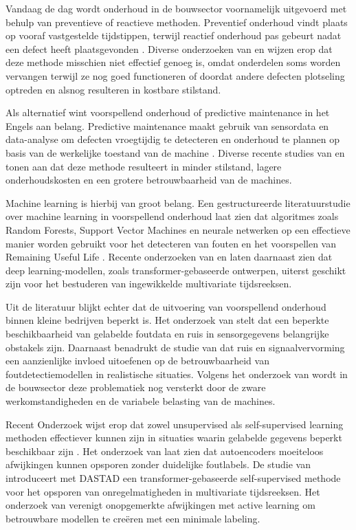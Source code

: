 Vandaag de dag wordt onderhoud in de bouwsector voornamelijk uitgevoerd met behulp van preventieve of reactieve methoden. Preventief onderhoud vindt plaats op vooraf vastgestelde tijdstippen, terwijl reactief onderhoud pas gebeurt nadat een defect heeft plaatsgevonden \autocite{Mikulic2024, Morganti2024}. Diverse onderzoeken van \textcite{Deepak2025} en \textcite{ErRatby2025} wijzen erop dat deze methode misschien niet effectief genoeg is, omdat onderdelen soms worden vervangen terwijl ze nog goed functioneren of doordat andere defecten plotseling optreden en alsnog resulteren in kostbare stilstand.

Als alternatief wint voorspellend onderhoud of predictive maintenance in het Engels aan belang. Predictive maintenance maakt gebruik van sensordata en data-analyse om defecten vroegtijdig te detecteren en onderhoud te plannen op basis van de werkelijke toestand van de machine \autocite{Carvalho2019}. Diverse recente studies van \textcite{ErRatby2025} en \textcite{Mahale2025} tonen aan dat deze methode resulteert in minder stilstand, lagere onderhoudskosten en een grotere betrouwbaarheid van de machines.

Machine learning is hierbij van groot belang. Een gestructureerde literatuurstudie over machine learning in voorspellend onderhoud laat zien dat algoritmes zoals Random Forests, Support Vector Machines en neurale netwerken op een effectieve manier worden gebruikt voor het detecteren van fouten en het voorspellen van Remaining Useful Life \autocite{Carvalho2019}. Recente onderzoeken van \textcite{Li2025} en \textcite{Aggarwal2025} laten daarnaast zien dat deep learning-modellen, zoals transformer-gebaseerde ontwerpen, uiterst geschikt zijn voor het bestuderen van ingewikkelde multivariate tijdsreeksen.

Uit de literatuur blijkt echter dat de uitvoering van voorspellend onderhoud binnen kleine bedrijven beperkt is. Het onderzoek van \textcite{Elahi2023} stelt dat een beperkte beschikbaarheid van gelabelde foutdata en ruis in sensorgegevens belangrijke obstakels zijn. Daarnaast benadrukt de studie van \textcite{Wang2025} dat ruis en signaalvervorming een aanzienlijke invloed uitoefenen op de betrouwbaarheid van foutdetectiemodellen in realistische situaties. Volgens het onderzoek van \textcite{Mikulic2024} wordt in de bouwsector deze problematiek nog versterkt door de zware werkomstandigheden en de variabele belasting van de machines.

Recent Onderzoek wijst erop dat zowel unsupervised als self-supervised learning methoden effectiever kunnen zijn in situaties waarin gelabelde gegevens beperkt beschikbaar zijn \autocite{Elahi2023}. Het onderzoek van \textcite{Giannoulidis2024} laat zien dat autoencoders moeiteloos afwijkingen kunnen opsporen zonder duidelijke foutlabels. 
De studie van \textcite{Aggarwal2025} introduceert met DASTAD een transformer-gebaseerde self-supervised methode voor het opsporen van onregelmatigheden in multivariate tijdsreeksen. Het onderzoek van \textcite{Holtz2025} verenigt onopgemerkte afwijkingen met active learning om betrouwbare modellen te creëren met een minimale labeling.

